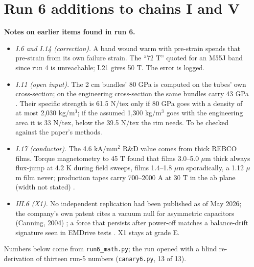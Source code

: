 \section*{Run 6 additions to chains I and V}
\noindent\textbf{Notes on earlier items found in run 6.}
\begin{itemize}
\item \emph{I.6 and I.14 (correction).} A band wound warm with pre-strain spends that pre-strain from its own failure strain. The ``72 T'' quoted for
an M55J band since run 4 is unreachable; I.21 gives 50 T. The error is logged.
\item \emph{I.11 (open input).} The 2 cm bundles' 80 GPa is computed on the tubes' own cross-section; on the engineering cross-section the
same bundles carry 43 GPa \cite{physt18}. Their specific strength is 61.5 N/tex only if 80 GPa goes with a density of at most 2{,}030
kg/m$^3$; if the assumed 1{,}300 kg/m$^3$ goes with the engineering area it is 33 N/tex, below the 39.5 N/tex the rim needs. To be checked
against the paper's methods.
\item \emph{I.17 (conductor).} The 4.6 kA/mm$^2$ R\&D value comes from thick REBCO films. Torque magnetometry to 45 T found that films
3.0--5.0 $\mu$m thick always flux-jump at 4.2 K during field sweeps, films 1.4--1.8 $\mu$m sporadically, a 1.12 $\mu$m film never;
production tapes carry 700--2000 A at 30 T in the ab plane (width not stated) \cite{jaroszynski25}.
\item \emph{III.6 (X1).} No independent replication had been published as of May 2026; the company's own patent cites a vacuum null for
asymmetric capacitors (Canning, 2004) \cite{exodus891}; a force that persists after power-off matches a balance-drift signature seen in
EMDrive tests \cite{tajmar15}. X1 stays at grade E.
\end{itemize}
Numbers below come from \texttt{run6\_math.py}; the run opened with a blind re-derivation of thirteen run-5 numbers (\texttt{canary6.py}, 13
of 13).

\setcounter{section}{1}\setcounter{subsection}{17}
